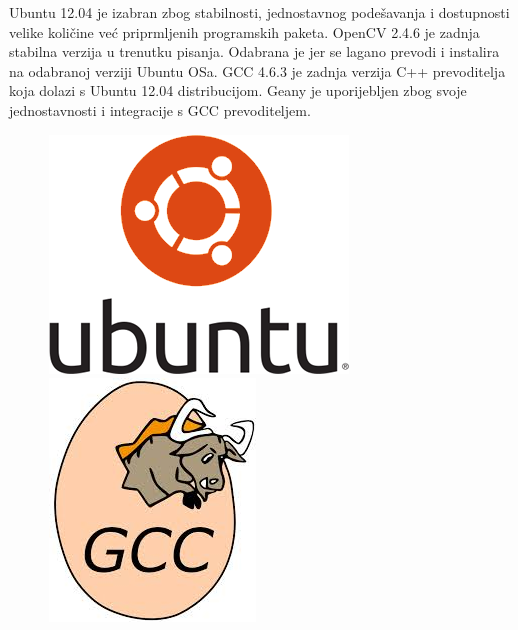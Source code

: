 Ubuntu 12.04 je izabran zbog stabilnosti, jednostavnog podešavanja i
dostupnosti velike količine već priprmljenih programskih paketa.  OpenCV
2.4.6 je zadnja stabilna verzija u trenutku pisanja. Odabrana je jer se
lagano prevodi i instalira na odabranoj verziji Ubuntu OSa.  GCC 4.6.3
je zadnja verzija C++ prevoditelja koja dolazi s Ubuntu 12.04
distribucijom.  Geany je uporijebljen zbog svoje jednostavnosti i
integracije s GCC prevoditeljem.  \\


\begin{figure}[!htb]
    \includegraphics[width=\linewidth]{figures/ubuntu.png}
\endminipage\hfill
{}
    \includegraphics[width=\linewidth]{figures/gcc.jpeg}

\end{figure}
